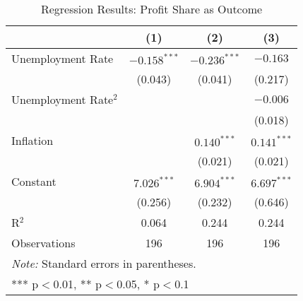 \begin{table}[!htbp]
\centering
\caption{Regression Results: Profit Share as Outcome}
\label{tab:profit_share_regs}
\begin{tabular}{lccc}
\hline\hline
& (1) & (2) & (3) \\
\hline
Unemployment Rate & $-0.158^{***}$ & $-0.236^{***}$ & $-0.163$ \\
 & (0.043) & (0.041) & (0.217) \\
Unemployment Rate$^2$ &  &  & $-0.006$ \\
 &  &  & (0.018) \\
Inflation &  & $0.140^{***}$ & $0.141^{***}$ \\
 &  & (0.021) & (0.021) \\
Constant & $7.026^{***}$ & $6.904^{***}$ & $6.697^{***}$ \\
 & (0.256) & (0.232) & (0.646) \\
\hline
R$^2$ & 0.064 & 0.244 & 0.244 \\
Observations & 196 & 196 & 196 \\
\hline\hline
\multicolumn{4}{l}{\textit{Note:} Standard errors in parentheses.} \\
\multicolumn{4}{l}{*** p$<$0.01, ** p$<$0.05, * p$<$0.1} \\
\end{tabular}
\end{table}
